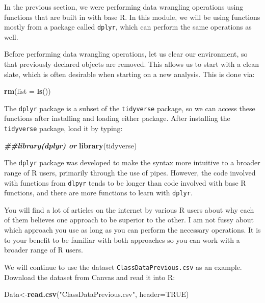 \documentclass[
]{book}
\newenvironment{Shaded}{\begin{snugshade}}{\end{snugshade}}
\newcommand{\AttributeTok}[1]{\textcolor[rgb]{0.13,0.29,0.53}{#1}}
\newcommand{\ConstantTok}[1]{\textcolor[rgb]{0.56,0.35,0.01}{#1}}
\newcommand{\DocumentationTok}[1]{\textcolor[rgb]{0.56,0.35,0.01}{\textbf{\textit{#1}}}}
\newcommand{\FunctionTok}[1]{\textcolor[rgb]{0.13,0.29,0.53}{\textbf{#1}}}
\newcommand{\NormalTok}[1]{#1}
\newcommand{\OtherTok}[1]{\textcolor[rgb]{0.56,0.35,0.01}{#1}}
\newcommand{\StringTok}[1]{\textcolor[rgb]{0.31,0.60,0.02}{#1}}
\begin{document}
In the previous section, we were performing data wrangling operations using functions that are built in with base R. In this module, we will be using functions mostly from a package called \texttt{dplyr}, which can perform the same operations as well.

Before performing data wrangling operations, let us clear our environment, so that previously declared objects are removed. This allows us to start with a clean slate, which is often desirable when starting on a new analysis. This is done via:

\begin{Shaded}
\begin{Highlighting}[]
\FunctionTok{rm}\NormalTok{(}\AttributeTok{list =} \FunctionTok{ls}\NormalTok{())}
\end{Highlighting}
\end{Shaded}

The \texttt{dplyr} package is a subset of the \texttt{tidyverse} package, so we can access these functions after installing and loading either package. After installing the \texttt{tidyverse} package, load it by typing:

\begin{Shaded}
\begin{Highlighting}[]
\DocumentationTok{\#\#library(dplyr) or}
\FunctionTok{library}\NormalTok{(tidyverse) }
\end{Highlighting}
\end{Shaded}

The \texttt{dplyr} package was developed to make the syntax more intuitive to a broader range of R users, primarily through the use of pipes. However, the code involved with functions from \texttt{dlpyr} tends to be longer than code involved with base R functions, and there are more functions to learn with \texttt{dplyr}.

You will find a lot of articles on the internet by various R users about why each of them believes one approach to be superior to the other. I am not fussy about which approach you use as long as you can perform the necessary operations. It is to your benefit to be familiar with both approaches so you can work with a broader range of R users.

We will continue to use the dataset \texttt{ClassDataPrevious.csv} as an example. Download the dataset from Canvas and read it into R:

\begin{Shaded}
\begin{Highlighting}[]
\NormalTok{Data}\OtherTok{\textless{}{-}}\FunctionTok{read.csv}\NormalTok{(}\StringTok{"ClassDataPrevious.csv"}\NormalTok{, }\AttributeTok{header=}\ConstantTok{TRUE}\NormalTok{)}
\end{Highlighting}
\end{Shaded}
\end{document}
